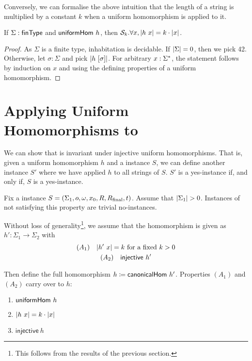 Conversely, we can formalise the above intuition that the length of a string is multiplied by a constant $k$ when a uniform homomorphism is applied to it.
\begin{lemma}
  If $\Sigma : \textsf{finType}$ and $\textsf{uniformHom}~h$, then $\mathcal{S}_{k}. \forall x, |h~x| = k \cdot |x|$. 
\end{lemma}
\begin{proof}
  As $\Sigma$ is a finite type, inhabitation is decidable. If $|\Sigma| = 0$, then we pick 42. 
  Otherwise, let $\sigma : \Sigma$ and pick $|h~[\sigma]|$. 
  For arbitrary $x : \Sigma^*$, the statement follows by induction on $x$ and using the defining properties of a uniform homomorphism.
\end{proof}

\section{Applying Uniform Homomorphisms to \PR{}}\label{sec:unif_hom_pr}
We can show that \PR{} is invariant under injective uniform homomorphisms. That is, given a uniform homomorphism $h$ and a \PR{} instance $S$, we can define another \PR{} instance $S'$ where we have applied $h$ to all strings of $S$. $S'$ is a yes-instance if, and only if, $S$ is a yes-instance. 

Fix a \PR{} instance $S = (\Sigma_1, o, \omega, x_0, R, R_{\text{final}}, t)$. 
Assume that $|\Sigma_1| > 0$. Instances of \PR{} not satisfying this property are trivial no-instances. 

Without loss of generality\footnote{This follows from the results of the previous section.}, we assume that the homomorphism is given as $h' : \Sigma_1 \rightarrow \Sigma_2$ with 
\begin{gather*}
  (A_1) \quad |h'~x| = k~\text{for a fixed } k > 0 \\
  (A_2) \quad \textsf{injective}~h'
\end{gather*}

Then define the full homomorphism $h \coloneqq \textsf{canonicalHom}~h'$. 
Properties $(A_1)$ and $(A_2)$ carry over to $h$:
\begin{proposition}\label{prop:h_properties}\leavevmode
  \begin{enumerate}
    \item $\textsf{uniformHom}~h$
    \item $|h~x| = k \cdot |x|$
    \item $\textsf{injective}~h$
  \end{enumerate}
\end{proposition}

